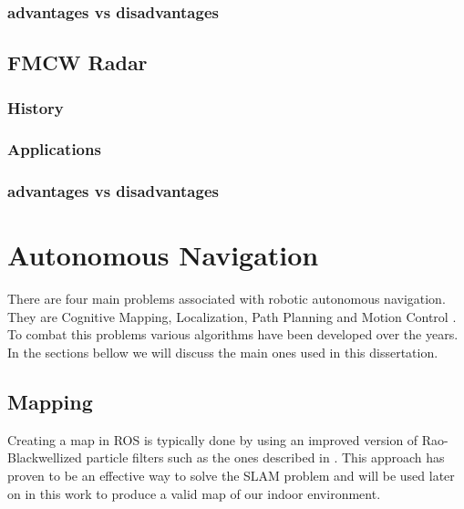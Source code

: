 \subsubsection{advantages vs disadvantages}

\subsection{FMCW Radar}

\subsubsection{History}
\subsubsection{Applications}
\subsubsection{advantages vs disadvantages}



\section {Autonomous Navigation}
There are four main problems associated with robotic autonomous navigation. They are Cognitive Mapping, Localization, Path Planning and Motion Control \cite{baranov2014}. To combat this problems various algorithms have been developed over the years. In the sections bellow we will discuss the main ones used in this dissertation.

\subsection{Mapping}

Creating a map in ROS is typically done by using an improved version of  Rao-Blackwellized particle filters such as the ones described in \cite{grisetti2007improved}. This approach has proven to be an effective way to solve the \ac{SLAM} problem and will be used later on in this work to produce a valid map of our indoor environment.
